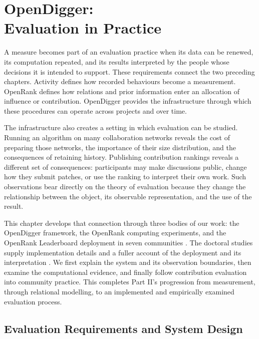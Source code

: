 \chapter[OpenDigger: Evaluation in Practice]{OpenDigger:\\Evaluation in Practice}
\label{ch:six}

A measure becomes part of an evaluation practice when its data can be renewed, its computation repeated, and its results interpreted by the people whose decisions it is intended to support. These requirements connect the two preceding chapters. Activity defines how recorded behaviours become a measurement. OpenRank defines how relations and prior information enter an allocation of influence or contribution. OpenDigger provides the infrastructure through which these procedures can operate across projects and over time.

The infrastructure also creates a setting in which evaluation can be studied. Running an algorithm on many collaboration networks reveals the cost of preparing those networks, the importance of their size distribution, and the consequences of retaining history. Publishing contribution rankings reveals a different set of consequences: participants may make discussions public, change how they submit patches, or use the ranking to interpret their own work. Such observations bear directly on the theory of evaluation because they change the relationship between the object, its observable representation, and the use of the result.

This chapter develops that connection through three bodies of our work: the OpenDigger framework, the OpenRank computing experiments, and the OpenRank Leaderboard deployment in seven communities \citep{wang2026digger,han2026rank,zhao2024}. The doctoral studies supply implementation details and a fuller account of the deployment and its interpretation \citep{zhao2025thesis,xia2024thesis}. We first explain the system and its observation boundaries, then examine the computational evidence, and finally follow contribution evaluation into community practice. This completes Part II's progression from measurement, through relational modelling, to an implemented and empirically examined evaluation process.

\section{Evaluation Requirements and System Design}
\label{sec:ch6-system}

